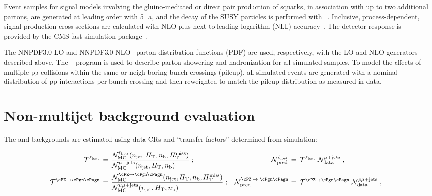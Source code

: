 Event samples for signal models involving the gluino-mediated or
direct pair production of squarks, in association with up to two
additional partons, are generated at leading order with
{\MADGRAPH{}5\_a\MCATNLO}, and the decay of the SUSY particles is
performed with ~\cite{pythia}. Inclusive,
process-dependent, signal production cross sections are calculated
with NLO plus next-to-leading-logarithm (NLL)
accuracy~\cite{Beenakker:1996ch, PhysRevLett.102.111802,
  PhysRevD.80.095004, 1126-6708-2009-12-041,
  doi:10.1142/S0217751X11053560, susynlo}. The detector response is
provided by the CMS fast simulation package~\cite{fastsim}.

The \textsc{NNPDF}3.0 LO and \textsc{NNPDF}3.0 NLO~\cite{nnpdf} parton
distribution functions (PDF) are used, respectively, with the LO and
NLO generators described above. The ~\cite{pythia} program
is used to describe parton showering and hadronization for all
simulated samples. To model the effects of multiple pp collisions
within the same or neigh boring bunch crossings (pileup), all simulated
events are generated with a nominal distribution of pp interactions
per bunch crossing and then reweighted to match the pileup
distribution as measured in data.


\clearpage
\section{Non-multijet background evaluation}
\label{sec:ewk}

The \lost and \znunuj backgrounds are estimated using data CRs and
``transfer factors'' determined from simulation:

\begin{align}
  \tf^{\lost} \, & = \,
  \frac{\mathcal{N}^{\lost}_\textrm{MC}(\njet, \scalht, \nb, \mht)}
  {\mathcal{N}^{\mj}_\textrm{MC}(\njet, \scalht, \nb)\hfill} \; ;
  & 
  \mathcal{N}^{\lost}_\textrm{pred} \, & = \,
  \tf^{\lost} \; \mathcal{N}^{\mj}_\textrm{data} \; ,
  \\
  \tf^{\znunu} \, & = \,
  \frac{\mathcal{N}^{\znunu}_\textrm{MC}(\njet, \scalht, \nb, \mht)}
  {\mathcal{N}^{\mmj}_\textrm{MC}(\njet, \scalht, \nb)\hfill} \; ;
  & 
  \mathcal{N}^\textrm{\znunu}_\textrm{pred} \, & = \,
  \tf^{\znunu} \; \mathcal{N}^{\mmj}_\textrm{data} \; ,
\end{align}

